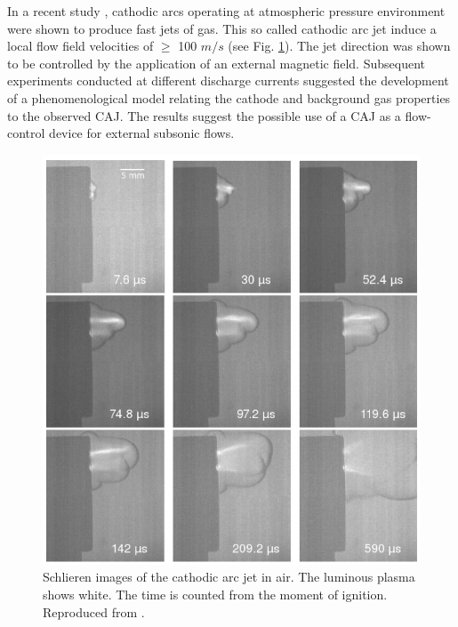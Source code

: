 \documentclass[a4paper]{iacas}%
\begin{document}
In a recent study \cite{KR}, cathodic arcs operating at atmospheric pressure environment were shown to produce fast jets of gas. This so called cathodic arc jet induce a local flow field velocities of $\ge$ 100 $m/s$ (see Fig. \ref{fig:CAJ}). The jet direction was shown to be controlled by the application of an external magnetic field. Subsequent experiments \cite{KRClose} conducted at different discharge currents suggested the development of a phenomenological model relating the cathode and background gas properties to the observed CAJ. The results suggest the possible use of a CAJ as a flow-control device for external subsonic flows\cite{KRFar}.

\begin{figure}
	\includegraphics[width=\textwidth]{CAJ_highres.png}
	\caption{Schlieren images of the cathodic arc jet in air. The luminous plasma shows white. The time is counted from the moment of ignition. Reproduced from \cite{KR}.}
	\label{fig:CAJ}
\end{figure}
\end{document}
